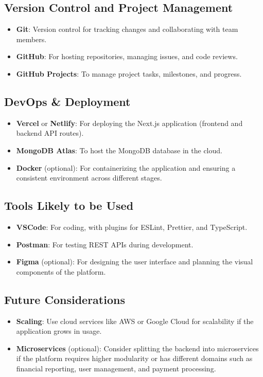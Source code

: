 \documentclass{article}
\begin{document}
\subsection{Version Control and Project Management}
\begin{itemize}
  \item \textbf{Git}: Version control for tracking changes and collaborating with team members.
  \item \textbf{GitHub}: For hosting repositories, managing issues, and code reviews.
  \item \textbf{GitHub Projects}: To manage project tasks, milestones, and progress.
\end{itemize}

\subsection{DevOps \& Deployment}
\begin{itemize}
  \item \textbf{Vercel} or \textbf{Netlify}: For deploying the Next.js application (frontend and backend API routes).
  \item \textbf{MongoDB Atlas}: To host the MongoDB database in the cloud.
  \item \textbf{Docker} (optional): For containerizing the application and ensuring a consistent environment across different stages.
\end{itemize}

\subsection{Tools Likely to be Used}
\begin{itemize}
  \item \textbf{VSCode}: For coding, with plugins for ESLint, Prettier, and TypeScript.
  \item \textbf{Postman}: For testing REST APIs during development.
  \item \textbf{Figma} (optional): For designing the user interface and planning the visual components of the platform.
\end{itemize}

\subsection{Future Considerations}
\begin{itemize}
  \item \textbf{Scaling}: Use cloud services like AWS or Google Cloud for scalability if the application grows in usage.
  \item \textbf{Microservices} (optional): Consider splitting the backend into microservices if the platform requires higher modularity or has different domains such as financial reporting, user management, and payment processing.
\end{itemize}
\end{document}
